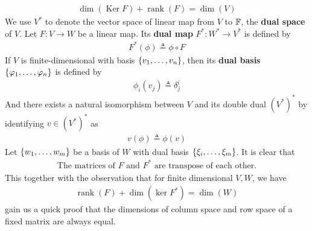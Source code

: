\documentclass{report}
\begin{document}
\begin{mdframed}
\begin{align*}
\operatorname{dim}(\operatorname{Ker}F)+ \operatorname{rank}(F)= \operatorname{dim}(V)
\end{align*}
We use $V^*$ to denote the vector space of linear map from  $V$ to  $\mathbb{F}$, the  \textbf{dual space} of $V$. Let $F:V\rightarrow W$ be a linear map. Its \textbf{dual map} $F^*:W^*\rightarrow V^*$ is defined by 
\begin{align*}
F^*(\phi)\triangleq \phi \circ F
\end{align*}
If $V$ is finite-dimensional with basis  $\{ v_1,\dots ,v_n \}$, then its \textbf{dual basis} $\{ \varphi_1,\dots ,\varphi_n \}$ is defined by 
\begin{align*}
\phi_i (v_j)\triangleq \delta^i_j
\end{align*}
And there exists a natural isomorphism between $V$ and its double dual  $(V^*)^*$ by identifying $v\in (V^*)^*$ as 
\begin{align*}
v(\phi) \triangleq \phi (v)
\end{align*}
Let $\{ w_1,\dots ,w_m \}$ be a basis of $W$ with dual basis  $\{ \xi_i , \dots ,\xi_m \}$. It is clear that
\begin{align*}
  \text{ The matrices of $F$ and  $F^*$ are transpose of each other. }
\end{align*}
This together with the observation that for finite dimensional $V,W$, we have 
 \begin{align*}
\operatorname{rank}(F)+ \operatorname{dim}(\operatorname{ker}F^*)= \operatorname{dim}(W)
\end{align*}
gain us a quick proof that the dimensions of column space and row space of a fixed matrix are always equal. 
\end{mdframed}
\end{document}

